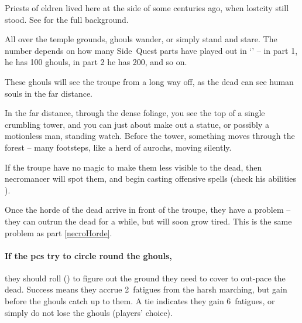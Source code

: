 

Priests of \gls{eldren} lived here at the side of  some centuries ago, when \gls{lostcity} still stood.
See  for the full background.

All over the temple grounds, ghouls wander, or simply stand and stare.
The number depends on how many Side~Quest parts have played out in `' -- in part 1, he has 100 ghouls, in part 2 he has 200, and so on.

These ghouls will see the troupe from a long way off, as the dead can see human souls in the far distance.

\begin{boxtext}
  In the far distance, through the dense foliage, you see the top of a single crumbling tower, and you can just about make out a statue, or possibly a motionless man, standing watch.
  Before the tower, something moves through the forest -- many footsteps, like a herd of aurochs, moving silently.%
\end{boxtext}

If the troupe have no magic to make them less visible to the dead, then \gls{necromancer} will spot them, and begin casting offensive spells (check his abilities ).

Once the horde of the dead arrive in front of the troupe, they have a problem -- they can outrun the dead for a while, but will soon grow tired.
This is the same problem as part \vref{necroHorde}.

\paragraph{If the \glspl{pc} try to circle round the ghouls,}
they should roll  (\tn[8]) to figure out the ground they need to cover to out-pace the dead.
Success means they accrue 2~\glspl{fatigue} from the harsh marching, but gain  before the ghouls catch up to them.
A tie indicates they gain 6~\glspl{fatigue}, or simply do not lose the ghouls (players' choice).

